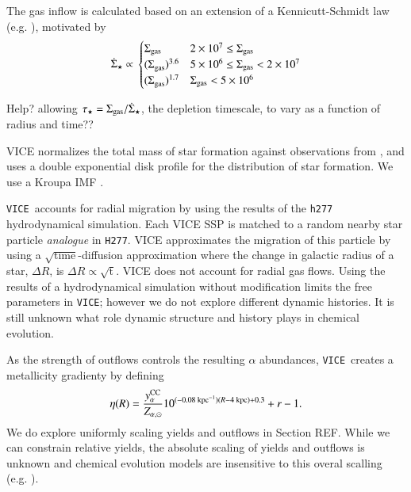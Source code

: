 \documentclass[12pt,oneside]{report}
\newcommand{\VICE}{\texttt{VICE}}
\begin{document}
The gas inflow is calculated based on an extension of a Kennicutt-Schmidt law (e.g. \cite{kennicutt98}), motivated by 
\begin{equation}
\dot{\Sigma}_{\star} \propto \\
\begin{cases}
    {\Sigma}_{\rm gas} & 2\times 10^7 \leq \Sigma_{\rm gas} \\ 
    {(\Sigma}_{\rm gas})^{3.6} & 5\times 10^6 \leq \Sigma_{\rm gas} < 2\times10^7 \\ 
    {(\Sigma}_{\rm gas})^{1.7} & \Sigma_{\rm gas} < 5\times10^6 \\ 
\end{cases}
\end{equation}

Help? allowing $\tau_\star = \Sigma_{\rm gas}/\dot{\Sigma}_{\star}$, the depletion timescale, to vary as a function of radius and time??

VICE normalizes the total mass of star formation against observations from \cite{LM15}, and uses a double exponential disk profile for the distribution of star formation.  We use a Kroupa IMF \cite{kroupa01}.

\VICE\ accounts for radial migration by using the results of the \texttt{h277} hydrodynamical simulation. Each VICE SSP is matched to a random nearby star particle \textit{analogue} in \texttt{H277}. VICE approximates the migration of this particle by using a $\sqrt{\text{time}}$-diffusion approximation where the change in galactic radius of a star, $\Delta R$, is $\Delta R \propto \sqrt{\text{t}}$. 
VICE does not account for radial gas flows. 
Using the results of a hydrodynamical simulation without modification limits the free parameters in \VICE; however we do not explore different dynamic histories. It is still unknown what role dynamic structure and history plays in chemical evolution.

As the strength of outflows controls the resulting $\alpha$ abundances, \VICE~creates a metallicity gradienty by defining
\begin{equation}
\eta(R) = \frac{y_{\alpha}^{\rm CC}}{Z_{\alpha, \odot}} 10^{(-0.08\text{ kpc}^{-1})(R-4\text{ kpc})+0.3} + r - 1.
\end{equation}
We do explore uniformly scaling yields and outflows in Section REF. While we can constrain relative yields, the absolute scaling of yields and outflows is unknown and chemical evolution models are insensitive to this overal scalling (e.g. \cite{james_dwarf}).
\end{document}
